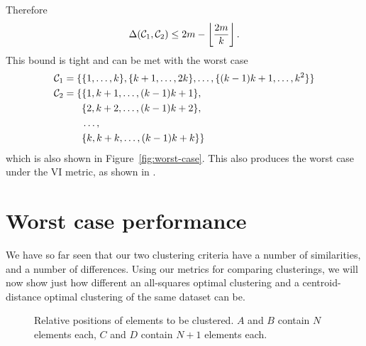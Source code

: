 Therefore
\begin{equation*}
  \Delta(\mathcal{C}_1,\mathcal{C}_2) \leq 2m - \left\lfloor \frac{2m}{k} \right\rfloor.
\end{equation*}
This bound is tight and can be met with the worst case
\begin{align*}
  \mathcal{C}_1 = \{&\{1,\dotsc,k\},\{k+1,\dotsc,2k\},\dotsc,\{(k-1)k+1,\dotsc,k^2\}\} \\
  \mathcal{C}_2 = \{&\{1,k+1,\dotsc,(k-1)k+1\},\\
  &\{2,k+2,\dotsc,(k-1)k+2\},\\
  &\dotsc,\\
  &\{k,k+k,\dotsc,(k-1)k+k\}\}
\end{align*}
which is also shown in Figure~\ref{fig:worst-case}.  This also produces the
worst case under the VI metric, as shown in \citep{meila-2007}.

\section{Worst case performance}
\label{sec:worst-case-perf}

We have so far seen that our two clustering criteria have a number of
similarities, and a number of differences.  Using our metrics for comparing
clusterings, we will now show just how different an all-squares optimal
clustering and a centroid-distance optimal clustering of the same dataset can
be.

\begin{figure}
  \centering
  \caption{Relative positions of elements to be clustered.  $A$ and $B$
    contain $N$ elements each, $C$ and $D$ contain $N+1$ elements each.}
  \label{fig:clusters}
\end{figure}

